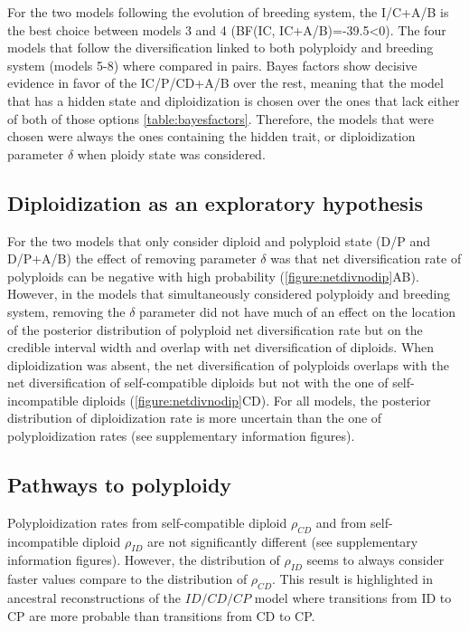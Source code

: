 For the two models following the evolution of breeding system, the I/C+A/B is the best choice between models 3 and 4 (BF(IC, IC+A/B)=-39.5<0).
%
The four models that follow the diversification linked to both polyploidy and breeding system (models 5-8) where compared in pairs.
Bayes factors show decisive evidence in favor of the IC/P/CD+A/B over the rest, meaning that the model that has a hidden state and diploidization is chosen over the ones that lack either of both of those options \cref{table:bayesfactors}.
%
Therefore, the models that were chosen were always the ones containing the hidden trait, or diploidization parameter $\delta$ when ploidy state was considered.

\subsection{Diploidization as an exploratory hypothesis}

For the two models that only consider diploid and polyploid state (D/P and D/P+A/B) the effect of removing parameter $\delta$ was that net diversification rate of polyploids can be negative with high probability (\cref{figure:netdivnodip}AB).
However, in the models that simultaneously considered polyploidy and breeding system, removing the $\delta$ parameter did not have much of an effect on the location of the posterior distribution of polyploid net diversification rate but on the credible interval width and overlap with net diversification of diploids.
When diploidization was absent, the net diversification of polyploids overlaps with the net diversification of self-compatible diploids but not with the one of self-incompatible diploids (\cref{figure:netdivnodip}CD).
For all models, the posterior distribution of diploidization rate is more uncertain than the one of polyploidization rates (see supplementary information figures). 

\subsection{Pathways to polyploidy}


Polyploidization rates from self-compatible diploid $\rho_{CD}$ and from self-incompatible diploid $\rho_{ID}$ are not significantly different (see supplementary information figures).
However, the distribution of $\rho_{ID}$ seems to always consider faster values compare to the distribution of $\rho_{CD}$.
This result is highlighted in ancestral reconstructions of the $ID/CD/CP$ model where transitions from ID to CP are more probable than transitions from CD to CP. %



